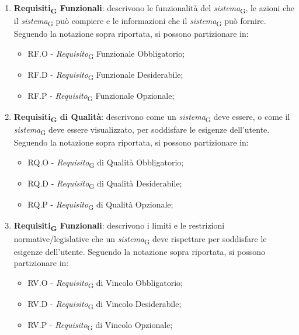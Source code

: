\begin{enumerate}
    \item \textbf{Requisiti\textsubscript{G} Funzionali}: descrivono le funzionalità del \textit{sistema}\textsubscript{G}, le azioni che il \textit{sistema}\textsubscript{G} può compiere e le informazioni che il \textit{sistema}\textsubscript{G} può fornire. Seguendo la notazione sopra riportata, si possono partizionare in:
    \begin{itemize}
        \item RF.O - \textit{Requisito}\textsubscript{G} Funzionale Obbligatorio;
        \item RF.D - \textit{Requisito}\textsubscript{G} Funzionale Desiderabile;
        \item RF.P - \textit{Requisito}\textsubscript{G} Funzionale Opzionale;
    \end{itemize}
     \item \textbf{Requisiti\textsubscript{G} di Qualità}: descrivono come un \textit{sistema}\textsubscript{G} deve essere, o come il \textit{sistema}\textsubscript{G} deve essere visualizzato, per soddisfare le esigenze dell’utente. Seguendo la notazione sopra riportata, si possono partizionare in:
    \begin{itemize}
        \item RQ.O - \textit{Requisito}\textsubscript{G} di Qualità Obbligatorio;
        \item RQ.D - \textit{Requisito}\textsubscript{G} di Qualità Desiderabile;
        \item RQ.P - \textit{Requisito}\textsubscript{G} di Qualità Opzionale;
    \end{itemize}
     \item \textbf{Requisiti\textsubscript{G} Funzionali}: descrivono i limiti e le restrizioni normative/legislative che un \textit{sistema}\textsubscript{G} deve rispettare per soddisfare le esigenze dell’utente. Seguendo la notazione sopra riportata, si possono partizionare in:
    \begin{itemize}
        \item RV.O - \textit{Requisito}\textsubscript{G} di Vincolo Obbligatorio;
        \item RV.D - \textit{Requisito}\textsubscript{G} di Vincolo Desiderabile;
        \item RV.P - \textit{Requisito}\textsubscript{G} di Vincolo Opzionale;
    \end{itemize}
\end{enumerate}

